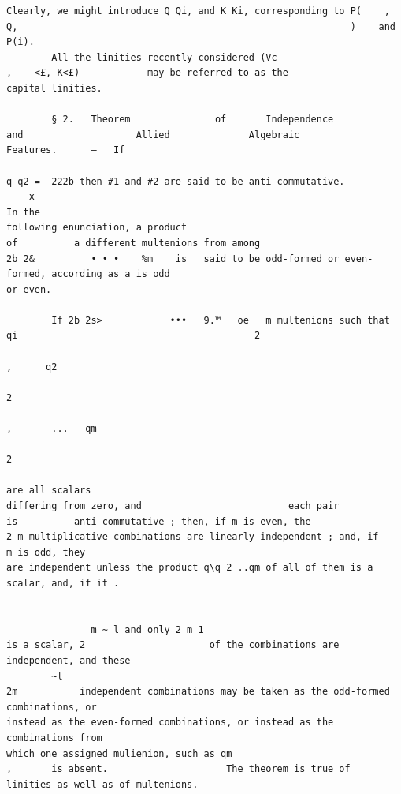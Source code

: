 \documentclass[10pt]{article}
\begin{document}
\begin{verbatim}
Clearly, we might introduce Q Qi, and K Ki, corresponding to P(    ,                               Q,                                                           )    and P(i).
        All the linities recently considered (Vc                                                   ,    <£, K<£)            may be referred to as the
capital linities.

        § 2.   Theorem               of       Independence                       and                    Allied              Algebraic                    Features.      —   If

q q2 = —222b then #1 and #2 are said to be anti-commutative.
    x                                                                                                                                                                 In the
following enunciation, a product                                                 of          a different multenions from among
2b 2&          • • •    %m    is   said to be odd-formed or even-formed, according as a is odd
or even.

        If 2b 2s>            •••   9.™   oe   m multenions such that qi                                          2
                                                                                                                     ,      q2
                                                                                                                              2
                                                                                                                                  ,       ...   qm
                                                                                                                                                     2
                                                                                                                                                         are all scalars
differing from zero, and                          each pair              is          anti-commutative ; then, if m is even, the
2 m multiplicative combinations are linearly independent ; and, if                                                                                         m is odd, they
are independent unless the product q\q 2 ..qm of all of them is a scalar, and, if it .


               m ~ l and only 2 m_1
is a scalar, 2                      of the combinations are independent, and these
        ~l
2m           independent combinations may be taken as the odd-formed combinations, or
instead as the even-formed combinations, or instead as the combinations from
which one assigned mulienion, such as qm                                                       ,       is absent.                     The theorem is true of
linities as well as of multenions.


\end{verbatim}
\end{document}
